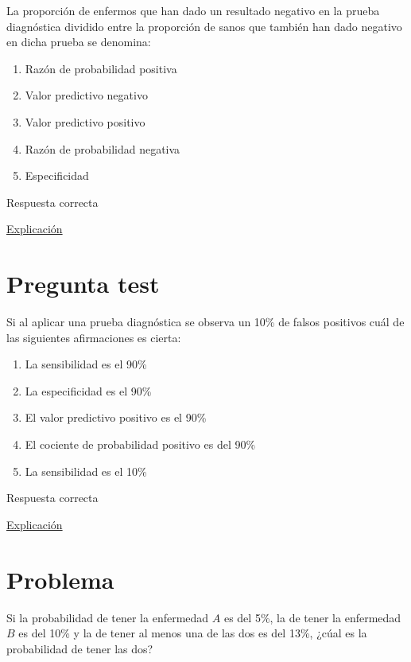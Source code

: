 \documentclass[
]{book}
\providecommand{\tightlist}{%
  \setlength{\itemsep}{0pt}\setlength{\parskip}{0pt}}
\begin{document}
La proporción de enfermos que han dado un resultado negativo en la prueba diagnóstica dividido entre la proporción de sanos que también han dado negativo en dicha prueba se denomina:

\begin{enumerate}
\def\labelenumi{\alph{enumi})}
\tightlist
\item
  Razón de probabilidad positiva
\item
  Valor predictivo negativo
\item
  Valor predictivo positivo
\item
  Razón de probabilidad negativa
\item
  Especificidad
\end{enumerate}

Respuesta correcta

\href{https://www.redalyc.org/journal/3555/355568264003/html/}{Explicación}

\hypertarget{pregunta-test-154}{%
\section{Pregunta test}\label{pregunta-test-154}}

Si al aplicar una prueba diagnóstica se observa un 10\% de falsos positivos cuál de las siguientes afirmaciones es cierta:

\begin{enumerate}
\def\labelenumi{\alph{enumi})}
\tightlist
\item
  La sensibilidad es el 90\%
\item
  La especificidad es el 90\%
\item
  El valor predictivo positivo es el 90\%
\item
  El cociente de probabilidad positivo es del 90\%
\item
  La sensibilidad es el 10\%
\end{enumerate}

Respuesta correcta

\href{https://1fjmanzano.github.io/bioestadistica/relaci\%C3\%B3n-entre-variables-cualitativas.html\#diagno\%CC\%81stico-cli\%CC\%81nico}{Explicación}

\hypertarget{problema-13}{%
\section{Problema}\label{problema-13}}

Si la probabilidad de tener la enfermedad \(A\) es del 5\%, la de tener la enfermedad \(B\) es del 10\% y la de tener al menos una de las dos es del 13\%, ¿cúal es la probabilidad de tener las dos?
\end{document}

